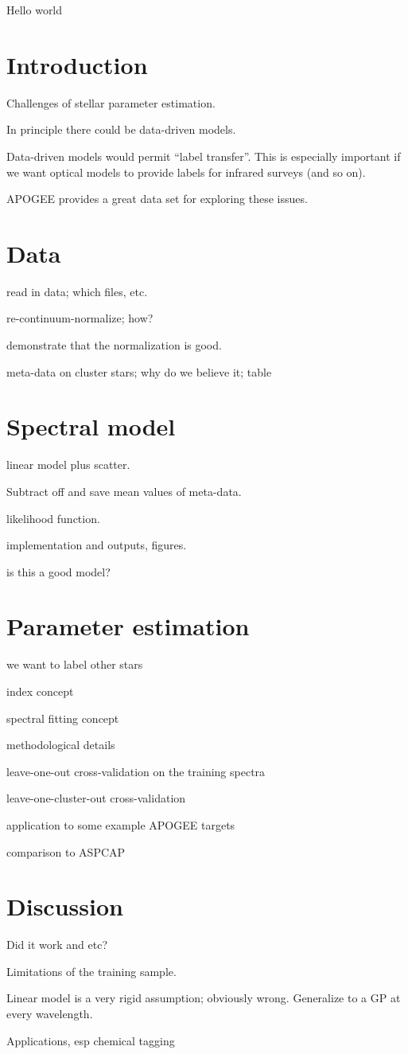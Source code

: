 \documentclass[12pt, preprint]{aastex}
\begin{document}
Hello world

\section{Introduction}

Challenges of stellar parameter estimation.

In principle there could be data-driven models.

Data-driven models would permit ``label transfer''.
This is especially important if we want optical models to provide labels for infrared surveys (and so on).

APOGEE provides a great data set for exploring these issues.

\section{Data}

read in data; which files, etc.

re-continuum-normalize; how?

demonstrate that the normalization is good.

meta-data on cluster stars; why do we believe it; table

\section{Spectral model}

linear model plus scatter.

Subtract off and save mean values of meta-data.

likelihood function.

implementation and outputs, figures.

is this a good model?

\section{Parameter estimation}

we want to label other stars

index concept

spectral fitting concept

methodological details

leave-one-out cross-validation on the training spectra

leave-one-cluster-out cross-validation

application to some example APOGEE targets

comparison to ASPCAP

\section{Discussion}

Did it work and etc?

Limitations of the training sample.

Linear model is a very rigid assumption; obviously wrong.
Generalize to a GP at every wavelength.

Applications, esp chemical tagging
\end{document}
